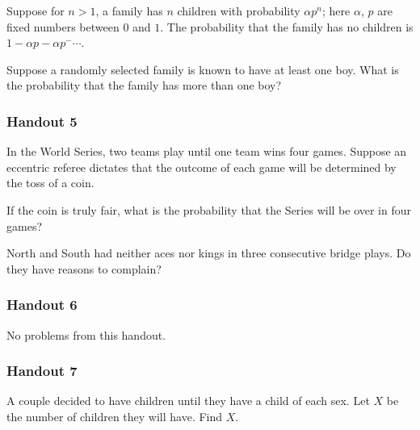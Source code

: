 \begin{problem}[Handout 4, \# 16]
  Suppose for \(n>1\), a family has \(n\) children with probability
  \(\alpha p^n\); here \(\alpha\), \(p\) are fixed numbers between \(0\)
  and \(1\). The probability that the family has no children is \(1-\alpha
  p-\alpha p^-\dotsb\).

  \noindent Suppose a randomly selected family is known to have at least
  one boy. What is the probability that the family has more than one boy?
\end{problem}
\begin{solution*}
\end{solution*}

\subsubsection{Handout 5}
\begin{problem}[Handout 5, \# 6]
  In the World Series, two teams play until one team wins four
  games. Suppose an eccentric referee dictates that the outcome of each
  game will be determined by the toss of a coin.

  \noindent If the coin is truly fair, what is the probability that the
  Series will be over in four games?
\end{problem}
\begin{solution*}
\end{solution*}

\begin{problem}[Handout 5, \# 14]
  North and South had neither aces nor kings in three consecutive bridge
  plays. Do they have reasons to complain?
\end{problem}
\begin{solution*}
\end{solution*}

\subsubsection{Handout 6}
No problems from this handout.

\subsubsection{Handout 7}
\begin{problem}[Handout 7, \# 5]
  A couple decided to have children until they have a child of each
  sex. Let \(X\) be the number of children they will have. Find \(X\).
\end{problem}
\begin{solution*}
\end{solution*}

